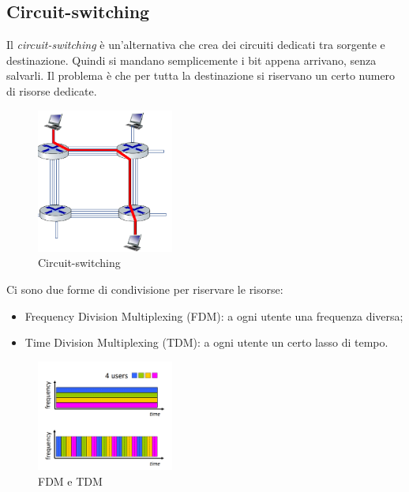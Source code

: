 \subsection{Circuit-switching}

Il \textit{circuit-switching} è un'alternativa che crea dei circuiti dedicati tra sorgente e destinazione. Quindi si mandano semplicemente i bit appena arrivano, senza salvarli. Il problema è che per tutta la destinazione si riservano un certo numero di risorse dedicate.

\begin{figure}[h]
\caption{Circuit-switching}
\centering
\includegraphics[width=0.4\textwidth]{images/Intro/Circuit switching.png}
\end{figure}

Ci sono due forme di condivisione per riservare le risorse:

\begin{itemize}
    \item Frequency Division Multiplexing (FDM): a ogni utente una frequenza diversa;
    \item Time Division Multiplexing (TDM): a ogni utente un certo lasso di tempo.
\end{itemize}

\begin{figure}[h]
\caption{FDM e TDM}
\centering
\includegraphics[width=0.4\textwidth]{images/Intro/FDM and TDM.png}
\end{figure}


